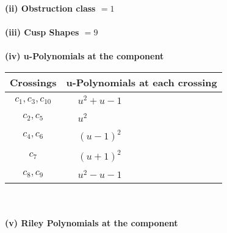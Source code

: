\documentclass[1p]{elsarticle_modified}
\theoremstyle{definition}
\begin{document}
\flushleft \textbf{(ii) Obstruction class $= 1$}\\~\\
\flushleft \textbf{(iii) Cusp Shapes $= 9$}\\~\\
\newpage\renewcommand{\arraystretch}{1}
\flushleft \textbf{(iv) u-Polynomials at the component}\newline \\
\begin{tabular}{m{50pt}|m{274pt}}
Crossings & \hspace{64pt}u-Polynomials at each crossing \\
\hline $$\begin{aligned}c_{1},c_{3},c_{10}\end{aligned}$$&$\begin{aligned}
&u^2+u-1
\end{aligned}$\\
\hline $$\begin{aligned}c_{2},c_{5}\end{aligned}$$&$\begin{aligned}
&u^2
\end{aligned}$\\
\hline $$\begin{aligned}c_{4},c_{6}\end{aligned}$$&$\begin{aligned}
&(u-1)^2
\end{aligned}$\\
\hline $$\begin{aligned}c_{7}\end{aligned}$$&$\begin{aligned}
&(u+1)^2
\end{aligned}$\\
\hline $$\begin{aligned}c_{8},c_{9}\end{aligned}$$&$\begin{aligned}
&u^2- u-1
\end{aligned}$\\
\hline
\end{tabular}\\~\\
\newpage\renewcommand{\arraystretch}{1}
\flushleft \textbf{(v) Riley Polynomials at the component}\newline \\
\end{document}
